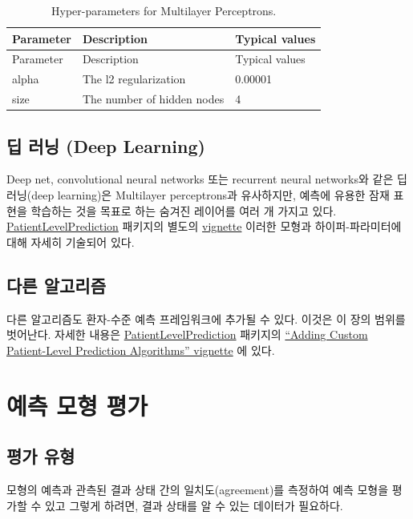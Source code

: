 \documentclass[11pt]{book}
\theoremstyle{definition}
\theoremstyle{definition}
\theoremstyle{definition}
\theoremstyle{remark}
\begin{document}
\begin{longtable}[]{@{}lll@{}}
\caption{\label{tab:mpParameters} Hyper-parameters for Multilayer
Perceptrons.}\tabularnewline
\toprule
Parameter & Description & Typical values\tabularnewline
\midrule
\endfirsthead
\toprule
Parameter & Description & Typical values\tabularnewline
\midrule
\endhead
alpha & The l2 regularization & 0.00001\tabularnewline
size & The number of hidden nodes & 4\tabularnewline
\bottomrule
\end{longtable}

\subsection{딥 러닝 (Deep Learning)}\label{--deep-learning}

Deep net, convolutional neural networks 또는 recurrent neural networks와
같은 딥 러닝(deep learning)은 Multilayer perceptrons과 유사하지만,
예측에 유용한 잠재 표현을 학습하는 것을 목표로 하는 숨겨진 레이어를 여러
개 가지고 있다.
\href{https://ohdsi.github.io/PatientLevelPrediction/}{PatientLevelPrediction}
패키지의 별도의
\href{https://ohdsi.github.io/PatientLevelPrediction/articles/BuildingDeepLearningModels.html}{vignette}
이러한 모형과 하이퍼-파라미터에 대해 자세히 기술되어
있다. 

\subsection{다른 알고리즘}\label{-}

다른 알고리즘도 환자-수준 예측 프레임워크에 추가될 수 있다. 이것은 이
장의 범위를 벗어난다. 자세한 내용은
\href{https://ohdsi.github.io/PatientLevelPrediction/}{PatientLevelPrediction}
패키지의
\href{https://ohdsi.github.io/PatientLevelPrediction/articles/AddingCustomAlgorithms.html}{``Adding
Custom Patient-Level Prediction Algorithms'' vignette} 에 있다.

\section{예측 모형 평가}\label{--}

\subsection{평가 유형}\label{-}

모형의 예측과 관측된 결과 상태 간의 일치도(agreement)를 측정하여 예측
모형을 평가할 수 있고 그렇게 하려면, 결과 상태를 알 수 있는 데이터가
필요하다. 
\end{document}
